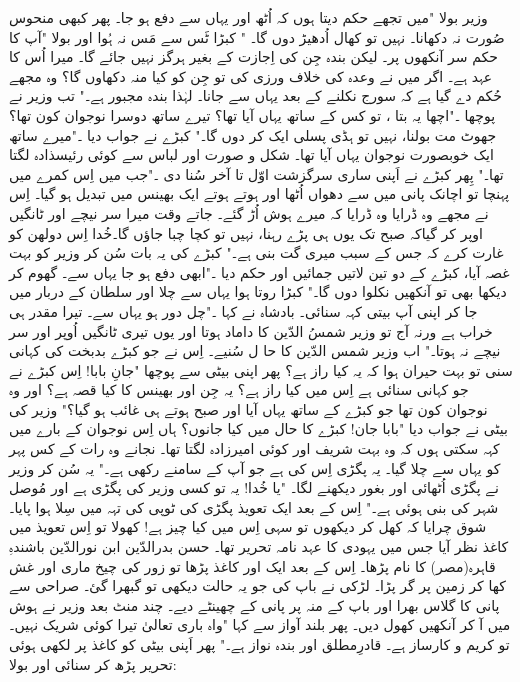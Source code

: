 وزیر بولا "میں تجھے حکم دیتا ہوں کہ اُٹھ اور یہاں سے دفع ہو جا۔ پھر کبھی منحوس صُورت نہ دکھانا۔ نہیں تو کھال اُدھیڑ دوں گا۔ "
کبڑا ٹَس سے مَس نہ ہُوا اور بولا "آپ کا حکم سر آنکھوں پر۔ لیکن بندہ جِن کی اِجازت کے بغیر ہرگز نہیں جائے گا۔ میرا اُس کا عہد ہے۔ اگر میں نے وعدہ کی خلاف ورزی کی تو جِن کو کیا منہ دکھاوں گا؟ وہ مجھے حُکم دے گیا ہے کہ سورج نکلنے کے بعد یہاں سے جانا۔ لہٰذا بندہ مجبور ہے۔"
تب وزیر نے پوچھا ۔"اچھا یہ بتا ، تو کس کے ساتھ یہاں آیا تھا؟ تیرے ساتھ دوسرا  نوجوان کون تھا؟ جھوٹ مت بولنا، نہیں تو ہڈی پسلی ایک کر دوں گا۔"
کبڑے نے جواب دیا ۔"میرے ساتھ ایک خوبصورت نوجوان یہاں آیا تھا۔ شکل و صورت اور لباس سے کوئی رئیسذادہ لگتا تھا۔"
پِھر کبڑے نے اَپنی ساری سرگزشت اوّل تا آخر سُنا دی ۔"جب میں اِس کمرے میں پہنچا تو اچانک پانی میں سے دھواں اُٹھا اور ہوتے ہوتے ایک بھینس میں تبدیل ہو گیا۔ اِس نے مجھے وہ ڈرایا وہ ڈرایا کہ میرے ہوش اُڑ گئے۔ جاتے وقت میرا سر نیچے اور ٹانگیں اوپر کر گیاکہ  صبح تک یوں ہی پڑے رہنا، نہیں تو کچا چبا جاؤں گا۔خُدا اِس دولھن کو غارت کرے کہ جس کے سبب میری گت بنی ہے۔"
کبڑے کی یہ بات سُن کر وزیر کو بہت غصہ آیا، کبڑے کے دو تین لاتیں جمائیں اور حکم دیا ۔"ابھی دفع ہو جا یہاں سے۔ گھوم کر دیکھا بھی تو آنکھیں نکلوا دوں گا۔"
کبڑا روتا ہوا یہاں سے چلا اور سلطان کے دربار میں جا کر اپنی آپ بیتی کہہ سنائی۔ بادشاہ نے کہا ۔"چل دور ہو یہاں سے۔ تیرا مقدر ہی خراب ہے ورنہ آج تو وزیر شمسُ الدّین کا داماد ہوتا اور یوں تیری ٹانگیں اُوپر اور سر نیچے نہ ہوتا۔"
اب وزیر شمس الدّین کا حا ل سُنیے۔
اِس نے جو کبڑے بدبخت کی کہانی سنی تو بہت حیران ہوا کہ یہ کیا راز ہے؟ پھر اپنی بیٹی سے پوچھا "جانِ بابا! اِس کبڑے نے جو کہانی سنائی ہے اِس میں کیا راز ہے؟ یہ جِن اور بھینس کا کیا قصہ ہے؟ اور وہ نوجوان کون تھا جو کبڑے کے ساتھ یہاں آیا اور صبح ہوتے ہی غائب ہو گیا؟"
وزیر کی بیٹی نے جواب دیا "بابا جان! کبڑے کا حال میں کیا جانوں؟ ہاں اِس نوجوان کے بارے میں کہہ سکتی ہوں کہ وہ بہت شریف اور کوئی امیرزادہ لگتا تھا۔ نجانے وہ رات کے کس پہر کو یہاں سے چلا گیا۔ یہ پگڑی اِس کی ہے جو آپ کے سامنے رکھی ہے۔"
یہ سُن کر وزیر نے پگڑی اُٹھائی اور بغور دیکھنے لگا۔ "یا خُدا!  یہ تو کسی وزیر کی پگڑی ہے اور مُوصل شہر کی بنی ہوئی ہے۔" اِس کے بعد ایک تعویذ پگڑی کی ٹوپی کی تہہ میں سِلا ہوا پایا۔ شوق چرایا کہ کھل کر دیکھوں تو سہی اِس میں کیا چیز ہے! کھولا تو اِس تعویذ میں کاغذ نظر آیا جس میں یہودی کا عہد نامہ تحریر تھا۔ حسن بدرالدّین ابن نورالدّین باشندہِ قاہرہ(مصر) کا نام پڑھا۔ اِس کے بعد  ایک اور کاغذ پڑھا تو زور کی چیخ ماری اور غش کھا کر زمین پر گر پڑا۔
لڑکی نے باپ کی جو یہ حالت دیکھی تو گبھرا گئ۔ صراحی سے پانی کا گلاس بھرا اور باپ کے منہ پر پانی کے چھینٹے دیے۔
چند منٹ بعد وزیر نے ہوش میں آ کر آنکھیں کھول دیں۔ پھر بلند آواز سے کہا "واہ باری تعالیٰ تیرا کوئی شریک نہیں۔ تو کریم و کارساز ہے۔ قادرِمطلق اور بندہ نواز ہے۔" پھر اَپنی بیٹی کو کاغذ پر لکھی ہوئی تحریر پڑھ کر سنائی اور بولا:

